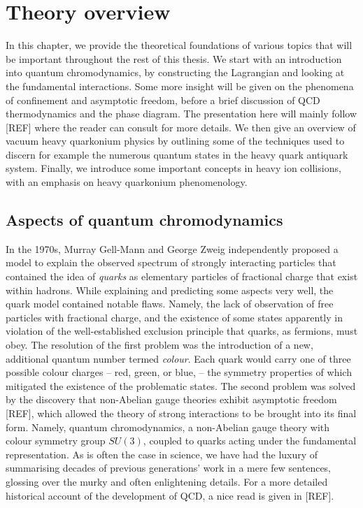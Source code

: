 \documentclass[12pt, a4paper, twoside]{book}
\newcommand{\brac}[1] {\!\left(#1\right)}
\begin{document}
\chapter{Theory overview}
\label{sec:theory_ov}
\onehalfspacing
In this chapter, we provide the theoretical foundations of various topics that will be important throughout the rest of this thesis. We start with an introduction into quantum chromodynamics, by constructing the Lagrangian and looking at the fundamental interactions. Some more insight will be given on the phenomena of confinement and asymptotic freedom, before a brief discussion of QCD thermodynamics and the phase diagram. The presentation here will mainly follow [REF] where the reader can consult for more details. We then give an overview of vacuum heavy quarkonium physics by outlining some of the techniques used to discern for example the numerous quantum states in the heavy quark antiquark system. Finally, we introduce some important concepts in heavy ion collisions, with an emphasis on heavy quarkonium phenomenology. 
\section{Aspects of quantum chromodynamics}
In the 1970s, Murray Gell-Mann and George Zweig independently proposed a model to explain the observed spectrum of strongly interacting particles that contained the idea of \emph{quarks} as elementary particles of fractional charge that exist within hadrons. While explaining and predicting some aspects very well, the quark model contained notable flaws. Namely, the lack of observation of free particles with fractional charge, and the existence of some states apparently in violation of the well-established exclusion principle that quarks, as fermions, must obey. The resolution of the first problem was the introduction of a new, additional quantum number termed \emph{colour}. Each quark would carry one of three possible colour charges -- red, green, or blue, -- the symmetry properties of which mitigated the existence of the problematic states. The second problem was solved by the discovery that non-Abelian gauge theories exhibit asymptotic freedom [REF], which allowed the theory of strong interactions to be brought into its final form. Namely, quantum chromodynamics, a non-Abelian gauge theory with colour symmetry group \(SU\brac{3}\), coupled to quarks acting under the fundamental representation. As is often the case in science, we have had the luxury of summarising decades of previous generations' work in a mere few sentences, glossing over the murky and often enlightening details. For a more detailed historical account of the development of QCD, a nice read is given in [REF].  
\end{document}
